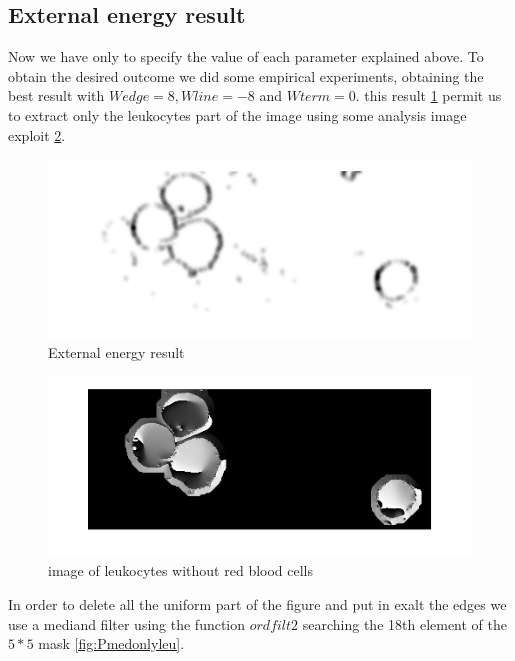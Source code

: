 \subsection{External energy result}
Now we have only to specify the value of each parameter explained above.
To obtain the desired outcome we did some empirical experiments, obtaining the best result with $ Wedge=8, Wline=-8 $ and $ Wterm=0$. this result \ref{fig:Eextforce} permit us to extract only the leukocytes part of the image using some analysis image exploit \ref{fig:onlyleu}.
\begin{figure}
	\begin{center}
		\centering
		\includegraphics[scale=0.5]{img/Eext.png}
		\caption{External energy result}
		\label{fig:Eextforce}
	\end{center}
\end{figure}

\begin{figure}
	\begin{center}
		\centering
		\includegraphics[scale=0.5]{img/onlyleuco.png}
		\caption{image of leukocytes without red blood cells}
		\label{fig:onlyleu}
	\end{center}
\end{figure}
In order to delete all the uniform part of the figure and put in exalt the edges we use a mediand filter using the function $ordfilt2$ searching the 18th element of the $5 * 5$ mask \ref{fig:Pmedonlyleu}.


